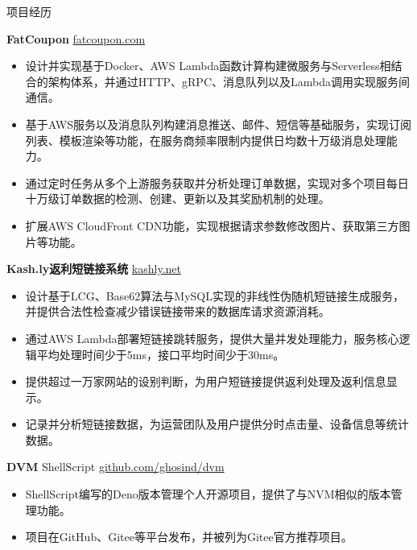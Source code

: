 \documentclass{resume} %
\begin{document}
\begin{rSection}{项目经历}
  \vspace{-1.25em}
  
  \item \textbf{FatCoupon} {} \hfill \href{www.fatcoupon.com}{fatcoupon.com}
  \begin{itemize}
    \itemsep -3pt {}
    \item 设计并实现基于Docker、AWS Lambda函数计算构建微服务与Serverless相结合的架构体系，并通过HTTP、gRPC、消息队列以及Lambda调用实现服务间通信。
    \item 基于AWS服务以及消息队列构建消息推送、邮件、短信等基础服务，实现订阅列表、模板渲染等功能，在服务商频率限制内提供日均数十万级消息处理能力。
    \item 通过定时任务从多个上游服务获取并分析处理订单数据，实现对多个项目每日十万级订单数据的检测、创建、更新以及其奖励机制的处理。
    \item 扩展AWS CloudFront CDN功能，实现根据请求参数修改图片、获取第三方图片等功能。
  \end{itemize}
  
  \item \textbf{Kash.ly返利短链接系统} {} \hfill \href{kashly.net}{kashly.net}
  \begin{itemize}
    \itemsep -3pt {}
    \item 设计基于LCG、Base62算法与MySQL实现的非线性伪随机短链接生成服务，并提供合法性检查减少错误链接带来的数据库请求资源消耗。
    \item 通过AWS Lambda部署短链接跳转服务，提供大量并发处理能力，服务核心逻辑平均处理时间少于5ms，接口平均时间少于30ms。
    \item 提供超过一万家网站的设别判断，为用户短链接提供返利处理及返利信息显示。
    \item 记录并分析短链接数据，为运营团队及用户提供分时点击量、设备信息等统计数据。
  \end{itemize}
  
  \item \textbf{DVM} {ShellScript} \hfill \href{github.com/ghosind/dvm}{github.com/ghosind/dvm}
  \begin{itemize}
    \itemsep -3pt {}
    \item ShellScript编写的Deno版本管理个人开源项目，提供了与NVM相似的版本管理功能。
    \item 项目在GitHub、Gitee等平台发布，并被列为Gitee官方推荐项目。
  \end{itemize}
  
\end{rSection}
\end{document}
